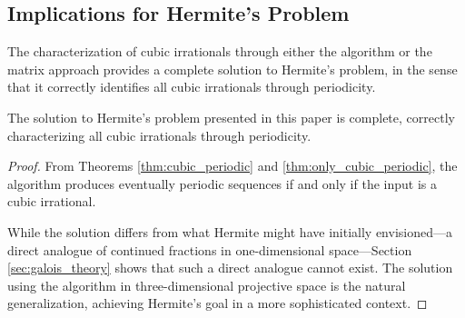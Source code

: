 \subsection{Implications for Hermite's Problem}

The characterization of cubic irrationals through either the \HAPD{} algorithm or the matrix approach provides a complete solution to Hermite's problem, in the sense that it correctly identifies all cubic irrationals through periodicity.

\begin{theorem}
The solution to Hermite's problem presented in this paper is complete, correctly characterizing all cubic irrationals through periodicity.
\end{theorem}

\begin{proof}
From Theorems \ref{thm:cubic_periodic} and \ref{thm:only_cubic_periodic}, the \HAPD{} algorithm produces eventually periodic sequences if and only if the input is a cubic irrational.

While the solution differs from what Hermite might have initially envisioned—a direct analogue of continued fractions in one-dimensional space—Section \ref{sec:galois_theory} shows that such a direct analogue cannot exist. The solution using the \HAPD{} algorithm in three-dimensional projective space is the natural generalization, achieving Hermite's goal in a more sophisticated context.
\end{proof}
